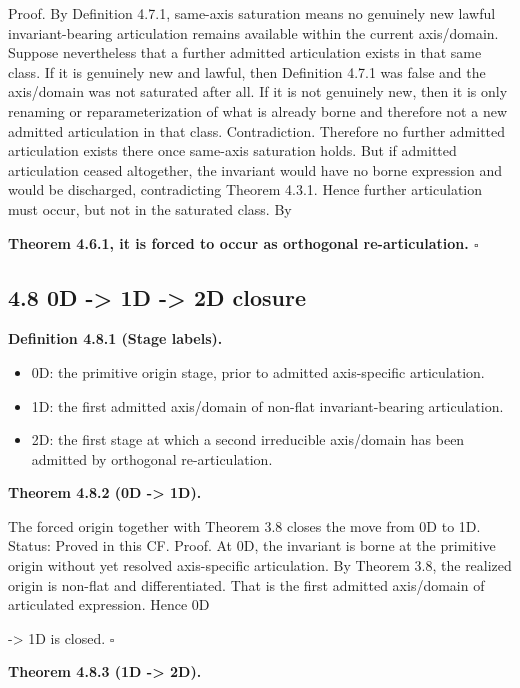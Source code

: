 \documentclass[11pt]{article}
\begin{document}
Proof. By Definition 4.7.1, same-axis saturation means no genuinely new lawful invariant-bearing articulation remains available within the current axis/domain. Suppose nevertheless that a further admitted articulation exists in that same class. If it is genuinely new and lawful, then Definition 4.7.1 was false and the axis/domain was not saturated after all. If it is not genuinely new, then it is only renaming or reparameterization of what is already borne and therefore not a new admitted articulation in that class. Contradiction. Therefore no further admitted articulation exists there once same-axis saturation holds. But if admitted articulation ceased altogether, the invariant would have no borne expression and would be discharged, contradicting Theorem 4.3.1. Hence further articulation must occur, but not in the saturated class. By

\textbf{Theorem 4.6.1, it is forced to occur as orthogonal re-articulation. $\square$}

\subsection{4.8 0D -\textgreater{} 1D -\textgreater{} 2D closure}\label{d---1d---2d-closure}

\textbf{Definition 4.8.1 (Stage labels).}

\begin{itemize}
\item
  0D: the primitive origin stage, prior to admitted axis-specific articulation.
\item
  1D: the first admitted axis/domain of non-flat invariant-bearing articulation.
\item
  2D: the first stage at which a second irreducible axis/domain has been admitted by orthogonal re-articulation.
\end{itemize}

\textbf{Theorem 4.8.2 (0D -\textgreater{} 1D).}

The forced origin together with Theorem 3.8 closes the move from 0D to 1D. Status: Proved in this CF. Proof. At 0D, the invariant is borne at the primitive origin without yet resolved axis-specific articulation. By Theorem 3.8, the realized origin is non-flat and differentiated. That is the first admitted axis/domain of articulated expression. Hence 0D

-\textgreater{} 1D is closed. $\square$

\textbf{Theorem 4.8.3 (1D -\textgreater{} 2D).}
\end{document}
